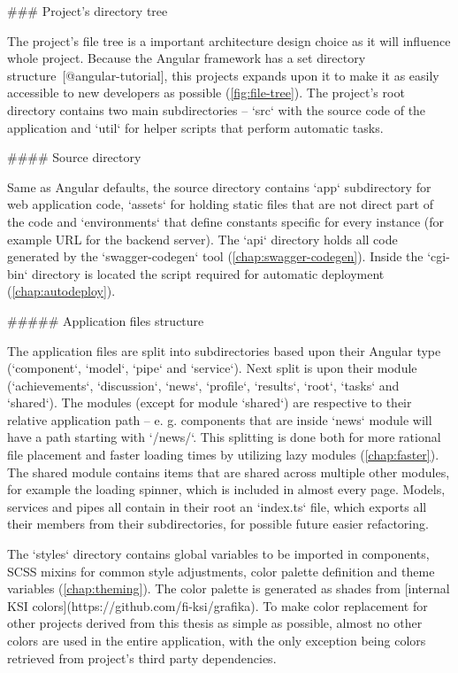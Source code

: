 \documentclass[
  digital, %
  oneside, %
  lof,     %
  lot,     %
]{fithesis4}
\begin{document}
{### Project's directory tree

The project's file tree is a important architecture design choice as it will influence whole project. Because the Angular framework has a set directory structure~[@angular-tutorial], this projects expands upon it to make it as easily accessible to new developers as possible (\autoref{fig:file-tree}). The project's root directory contains two main subdirectories -- `src` with the source code of the application and `util` for helper scripts that perform automatic tasks.

#### Source directory

Same as Angular defaults, the source directory contains `app` subdirectory for web application code, `assets` for holding static files that are not direct part of the code and `environments` that define constants specific for every instance (for example URL for the backend server). The `api` directory holds all code generated by the `swagger-codegen` tool (\autoref{chap:swagger-codegen}). Inside the `cgi-bin` directory is located the script required for automatic deployment (\autoref{chap:autodeploy}).

##### Application files structure

The application files are split into subdirectories based upon their Angular type (`component`, `model`, `pipe` and `service`). Next split is upon their module (`achievements`, `discussion`, `news`, `profile`, `results`, `root`, `tasks` and `shared`). The modules (except for module `shared`) are respective to their relative application path -- e. g. components that are inside `news` module will have a path starting with `/news/`. This splitting is done both for more rational file placement and faster loading times by utilizing lazy modules (\autoref{chap:faster}). The shared module contains items that are shared across multiple other modules, for example the loading spinner, which is included in almost every page. Models, services and pipes all contain in their root an `index.ts` file, which exports all their members from their subdirectories, for possible future easier refactoring.

The `styles` directory contains global variables to be imported in components, SCSS mixins for common style adjustments, color palette definition and theme variables (\autoref{chap:theming}). The color palette is generated as shades from [internal KSI colors](https://github.com/fi-ksi/grafika). To make color replacement for other projects derived from this thesis as simple as possible, almost no other colors are used in the entire application, with the only exception being colors retrieved from project's third party dependencies.

}
\end{document}
